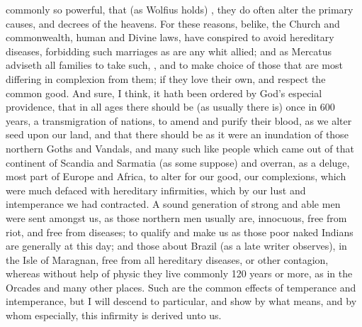 commonly so powerful, that (as Wolfius holds) , they do often alter the primary causes, and decrees of
the heavens. For these reasons, belike, the Church and commonwealth, human and
Divine laws, have conspired to avoid hereditary diseases, forbidding such
marriages as are any whit allied; and as Mercatus adviseth all families to take
such, , and to make choice of
those that are most differing in complexion from them; if they love their own,
and respect the common good. And sure, I think, it hath been ordered by God's
especial providence, that in all ages there should be (as usually there is)
once in 600 years, a transmigration of nations, to amend
and purify their blood, as we alter seed upon our land, and that there should
be as it were an inundation of those northern Goths and Vandals, and many such
like people which came out of that continent of Scandia and Sarmatia (as some
suppose) and overran, as a deluge, most part of Europe and Africa, to alter for
our good, our complexions, which were much defaced with hereditary infirmities,
which by our lust and intemperance we had contracted. A sound generation of
strong and able men were sent amongst us, as those northern men usually are,
innocuous, free from riot, and free from diseases; to qualify and make us as
those poor naked Indians are generally at this day; and those about Brazil (as
a late writer observes), in the Isle of Maragnan, free
from all hereditary diseases, or other contagion, whereas without help of
physic they live commonly 120 years or more, as in the Orcades and many other
places. Such are the common effects of temperance and intemperance, but I will
descend to particular, and show by what means, and by whom especially, this
infirmity is derived unto us.

